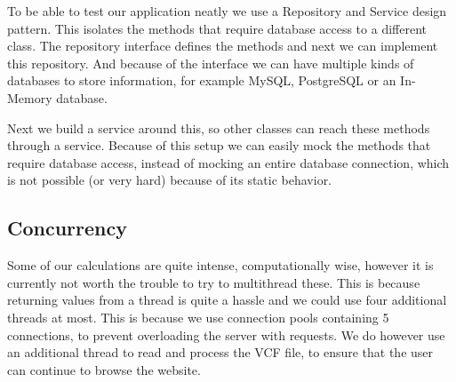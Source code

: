 		To be able to test our application neatly we use a Repository and Service design pattern. This isolates the methods that require database access to a different class. The repository interface defines the methods and next we can implement this repository. And because of the interface we can have multiple kinds of databases to store information, for example MySQL, PostgreSQL or an In-Memory database. 
		
		Next we build a service around this, so other classes can reach these methods through a service. Because of this setup we can easily mock the methods that require database access, instead of mocking an entire database connection, which is not possible (or very hard) because of its static behavior.
	\subsection{Concurrency }
		Some of our calculations are quite intense, computationally wise, however it is currently not worth the trouble to try to multithread these. This is because returning values from a thread is quite a hassle and we could use four additional threads at most. This is because we use connection pools containing 5 connections, to prevent overloading the server with requests. We do however use an additional thread to read and process the VCF file, to ensure that the user can continue to browse the website.
		
